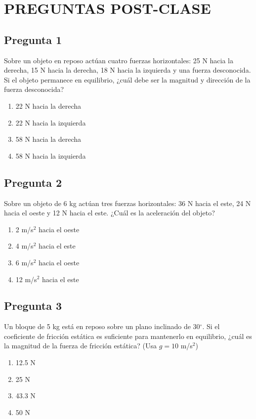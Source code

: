 \renewcommand{\tema}{Preguntas Post-Clase - Fuerzas y Leyes de Newton}

\twocolumn
\section{PREGUNTAS POST-CLASE}

\begin{preguntabox}
\subsection{Pregunta 1}
Sobre un objeto en reposo actúan cuatro fuerzas horizontales: 25 N hacia la derecha, 15 N hacia la derecha, 18 N hacia la izquierda y una fuerza desconocida. Si el objeto permanece en equilibrio, ¿cuál debe ser la magnitud y dirección de la fuerza desconocida?

\begin{enumerate}
    \item[A)] 22 N hacia la derecha
    \item[B)] 22 N hacia la izquierda
    \item[C)] 58 N hacia la derecha
    \item[D)] 58 N hacia la izquierda
\end{enumerate}
\end{preguntabox}

\begin{preguntabox}
\subsection{Pregunta 2}
Sobre un objeto de 6 kg actúan tres fuerzas horizontales: 36 N hacia el este, 24 N hacia el oeste y 12 N hacia el este. ¿Cuál es la aceleración del objeto?

\begin{enumerate}
    \item[A)] 2 m/s$^2$ hacia el oeste
    \item[B)] 4 m/s$^2$ hacia el este
    \item[C)] 6 m/s$^2$ hacia el oeste
    \item[D)] 12 m/s$^2$ hacia el este
\end{enumerate}
\end{preguntabox}

\begin{preguntabox}
\subsection{Pregunta 3}
Un bloque de 5 kg está en reposo sobre un plano inclinado de 30$^\circ$. Si el coeficiente de fricción estática es suficiente para mantenerlo en equilibrio, ¿cuál es la magnitud de la fuerza de fricción estática? (Usa $g = 10$ m/s$^2$)

\begin{enumerate}
    \item[A)] 12.5 N
    \item[B)] 25 N
    \item[C)] 43.3 N
    \item[D)] 50 N
\end{enumerate}
\end{preguntabox}

